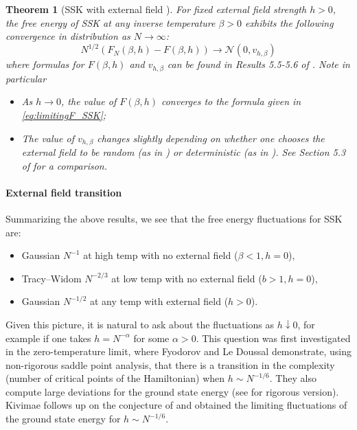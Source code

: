 \documentclass[11pt]{article}
\numberwithin{equation}{section}
\newcommand{\beq}{ \begin{equation} }
\newcommand{\eeq}{ \end{equation} }
\def \a {\alpha}
\def \b {\beta}
\def \cN {\mathcal{N}}
\newtheorem{theorem}{Theorem}[section]
\theoremstyle{remark}
\begin{document}
\begin{theorem}[SSK with external field \cite{ChenDeyPanchenko,Baiketal21,landon2020fluctuations}]
For fixed external field strength $h>0$, the free energy of SSK at any inverse temperature $\b>0$ exhibits the following convergence in distribution as $N\to\infty$:
\beq
N^{1/2}(F_N(\b,h)-F(\b,h))\to \cN(0,v_{h,\b})
\eeq
where formulas for $F(\b,h)$ and $v_{h,\b}$ can be found in Results 5.5-5.6 of \cite{Baiketal21}. Note in particular
\begin{itemize}
\item As $h\to0$, the value of $F(\b,h)$ converges to the formula given in \eqref{eq:limitingF_SSK};
\item The value of $v_{h,\b}$ changes slightly depending on whether one chooses the external field to be random (as in \cite{Baiketal21}) or deterministic (as in \cite{ChenDeyPanchenko,landon2020fluctuations}).  See Section 5.3 of \cite{Baiketal21} for a comparison.
\end{itemize}
\end{theorem}

\paragraph{External field transition}
Summarizing the above results, we see that the free energy fluctuations for SSK are:
\begin{itemize}
\item Gaussian $N^{-1}$ at high temp with no external field ($\b<1,h=0$),
\item Tracy--Widom $N^{-2/3}$ at low temp with no external field ($b>1,h=0$),
\item Gaussian $N^{-1/2}$ at any temp with external field ($h>0$).
\end{itemize}
Given this picture, it is natural to ask about the fluctuations as $h\downarrow0$, for example if one takes $h=N^{-\a}$ for some $\a>0$.  This question was first investigated in the zero-temperature limit, where Fyodorov and Le Doussal \cite{FyodorovleDoussal} demonstrate, using non-rigorous saddle point analysis, that there is a transition in the complexity (number of critical points of the Hamiltonian) when $h\sim N^{-1/6}$.  They also compute large deviations for the ground state energy (see \cite{DemboZeitouni} for rigorous version).  Kivimae \cite{kivimae2019critical} follows up on the conjecture of \cite{FyodorovleDoussal} and obtained the limiting fluctuations of the ground state energy for $h\sim N^{-1/6}$.
\end{document}
